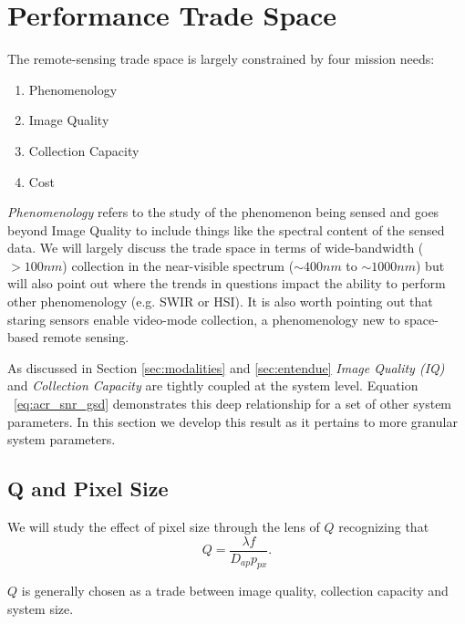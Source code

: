 \documentclass[]{spieman}  %
\begin{document}
\section{Performance Trade Space}
\label{sec:trade_space}

The remote-sensing trade space is largely constrained by four mission needs:

\begin{enumerate}
\item Phenomenology
\item Image Quality
\item Collection Capacity
\item Cost
\end{enumerate}

\emph{Phenomenology} refers to the study of the phenomenon being sensed and goes beyond Image Quality to include things like the spectral content of the sensed data.  We will largely discuss the trade space in terms of wide-bandwidth ($>100 nm$) collection in the near-visible spectrum ($\sim 400 nm$ to $\sim 1000 nm$) but will also point out where the trends in questions impact the ability to perform other phenomenology (e.g. SWIR or HSI).  It is also worth pointing out that staring sensors enable video-mode collection, a phenomenology new to space-based remote sensing.

As discussed in Section \ref{sec:modalities} and \ref{sec:entendue} \emph{Image Quality (IQ)} and \emph{Collection Capacity} are tightly coupled at the system level.  Equation ~\eqref{eq:acr_snr_gsd} demonstrates this deep relationship for a set of other system parameters.  In this section we develop this result as it pertains to more granular system parameters.  

\subsection{Q and Pixel Size}

We will study the effect of pixel size through the lens of $Q$ recognizing that \cite{fiete}
\begin{equation*}
    Q = \frac{\lambda f}{D_{ap} p_{px}}.
\end{equation*}


$Q$ is generally chosen as a trade between image quality, collection capacity and system size.  

\end{document}
